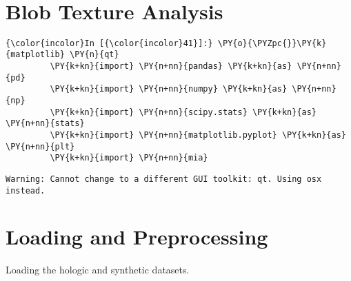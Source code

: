     \begin{center}
    \end{center}
    { \hspace*{\fill} \\}
    

\section*{Blob Texture Analysis}


    \begin{Verbatim}[commandchars=\\\{\}]
{\color{incolor}In [{\color{incolor}41}]:} \PY{o}{\PYZpc{}}\PY{k}{matplotlib} \PY{n}{qt}
         \PY{k+kn}{import} \PY{n+nn}{pandas} \PY{k+kn}{as} \PY{n+nn}{pd}
         \PY{k+kn}{import} \PY{n+nn}{numpy} \PY{k+kn}{as} \PY{n+nn}{np}
         \PY{k+kn}{import} \PY{n+nn}{scipy.stats} \PY{k+kn}{as} \PY{n+nn}{stats}
         \PY{k+kn}{import} \PY{n+nn}{matplotlib.pyplot} \PY{k+kn}{as} \PY{n+nn}{plt}
         \PY{k+kn}{import} \PY{n+nn}{mia}
\end{Verbatim}

    \begin{Verbatim}[commandchars=\\\{\}]
Warning: Cannot change to a different GUI toolkit: qt. Using osx instead.
    \end{Verbatim}

    \section{Loading and Preprocessing}\label{loading-and-preprocessing}

    Loading the hologic and synthetic datasets.


